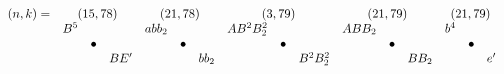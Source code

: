 \documentclass{article}
\begin{document}
\(
\begin{array}{crclrclrclrclrclrclrclrcl}
  (n,k)= & \multicolumn{3}{c}{(15,78)} & \multicolumn{3}{c}{(21,78)} & \multicolumn{3}{c}{(3,79)} & \multicolumn{3}{c}{(21,79)} & \multicolumn{3}{c}{(21,79)}  \\
  & B^5 & & & abb_2 & & & AB^2B_2^2 & & & ABB_2 &&& b^4 \\
  & & \bullet & & & \bullet & & & \bullet & & & \bullet & & & \bullet \\
  & & & BE' & & & bb_2 & & & B^2B_2^2 &&& BB_2 &&& e'
\end{array}
\)\\
\end{document}

